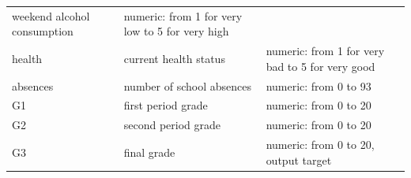 \documentclass[]{article}
\begin{document}
\begin{longtable}[]{@{}lll@{}}
\begin{minipage}[t]{0.28\columnwidth}
weekend alcohol consumption\strut
\end{minipage} & \begin{minipage}[t]{0.58\columnwidth}\raggedright
numeric: from 1 for very low to 5 for very high\strut
\end{minipage}\tabularnewline
\begin{minipage}[t]{0.05\columnwidth}\raggedright
health\strut
\end{minipage} & \begin{minipage}[t]{0.28\columnwidth}\raggedright
current health status\strut
\end{minipage} & \begin{minipage}[t]{0.58\columnwidth}\raggedright
numeric: from 1 for very bad to 5 for very good\strut
\end{minipage}\tabularnewline
\begin{minipage}[t]{0.05\columnwidth}\raggedright
absences\strut
\end{minipage} & \begin{minipage}[t]{0.28\columnwidth}\raggedright
number of school absences\strut
\end{minipage} & \begin{minipage}[t]{0.58\columnwidth}\raggedright
numeric: from 0 to 93\strut
\end{minipage}\tabularnewline
\begin{minipage}[t]{0.05\columnwidth}\raggedright
G1\strut
\end{minipage} & \begin{minipage}[t]{0.28\columnwidth}\raggedright
first period grade\strut
\end{minipage} & \begin{minipage}[t]{0.58\columnwidth}\raggedright
numeric: from 0 to 20\strut
\end{minipage}\tabularnewline
\begin{minipage}[t]{0.05\columnwidth}\raggedright
G2\strut
\end{minipage} & \begin{minipage}[t]{0.28\columnwidth}\raggedright
second period grade\strut
\end{minipage} & \begin{minipage}[t]{0.58\columnwidth}\raggedright
numeric: from 0 to 20\strut
\end{minipage}\tabularnewline
\begin{minipage}[t]{0.05\columnwidth}\raggedright
G3\strut
\end{minipage} & \begin{minipage}[t]{0.28\columnwidth}\raggedright
final grade\strut
\end{minipage} & \begin{minipage}[t]{0.58\columnwidth}\raggedright
numeric: from 0 to 20, output target\strut
\end{minipage}\tabularnewline
\bottomrule
\end{longtable}
\end{document}
